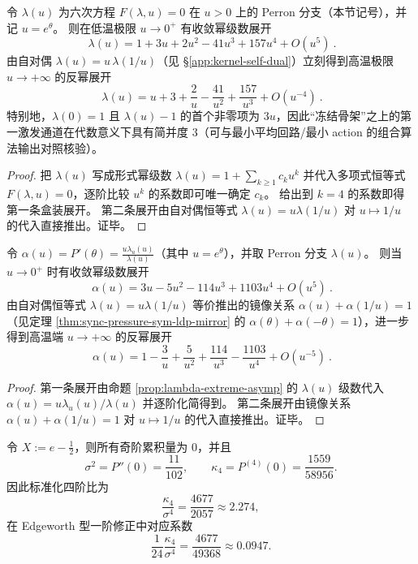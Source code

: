 \begin{proposition}\label{prop:lambda-extreme-asymp}
令 \(\lambda(u)\) 为六次方程 \(F(\lambda,u)=0\) 在 \(u>0\) 上的 Perron 分支（本节记号），并记 \(u=e^\theta\)。
则在低温极限 \(u\to 0^+\) 有收敛幂级数展开
\[
\boxed{\ \lambda(u)=1+3u+2u^2-41u^3+157u^4+O(u^5)\ }.
\]
由自对偶 \(\lambda(u)=u\,\lambda(1/u)\)（见 \S\ref{app:kernel-self-dual}）立刻得到高温极限 \(u\to+\infty\) 的反幂展开
\[
\boxed{\ \lambda(u)=u+3+\frac{2}{u}-\frac{41}{u^2}+\frac{157}{u^3}+O(u^{-4})\ }.
\]
特别地，\(\lambda(0)=1\) 且 \(\lambda(u)-1\) 的首个非零项为 \(3u\)，因此“冻结骨架”之上的第一激发通道在代数意义下具有简并度 \(3\)（可与最小平均回路/最小 action 的组合算法输出对照核验）。
\end{proposition}
\begin{proof}
把 \(\lambda(u)\) 写成形式幂级数
\(
\lambda(u)=1+\sum_{k\ge 1}c_k u^k
\)
并代入多项式恒等式 \(F(\lambda,u)=0\)，逐阶比较 \(u^k\) 的系数即可唯一确定 \(c_k\)。
给出到 \(k=4\) 的系数即得第一条盒装展开。
第二条展开由自对偶恒等式 \(\lambda(u)=u\lambda(1/u)\) 对 \(u\mapsto 1/u\) 的代入直接推出。证毕。
\end{proof}

\begin{corollary}[端点密度 \texorpdfstring{$\alpha(u)=P'(\log u)$}{alpha(u)=P'(log u)} 的局部展开]\label{cor:alpha-endpoint-series}
令 \(\alpha(u)=P'(\theta)=\frac{u\lambda_u(u)}{\lambda(u)}\)（其中 \(u=e^\theta\)），并取 Perron 分支 \(\lambda(u)\)。
则当 \(u\to 0^+\) 时有收敛幂级数展开
\[
\boxed{\ \alpha(u)=3u-5u^2-114u^3+1103u^4+O(u^5)\ }.
\]
由自对偶恒等式 \(\lambda(u)=u\lambda(1/u)\) 等价推出的镜像关系
\(
\alpha(u)+\alpha(1/u)=1
\)
（见定理 \ref{thm:sync-pressure-sym-ldp-mirror} 的 \(\alpha(\theta)+\alpha(-\theta)=1\)），进一步得到高温端 \(u\to+\infty\) 的反幂展开
\[
\boxed{\ \alpha(u)=1-\frac{3}{u}+\frac{5}{u^2}+\frac{114}{u^3}-\frac{1103}{u^4}+O(u^{-5})\ }.
\]
\end{corollary}
\begin{proof}
第一条展开由命题 \ref{prop:lambda-extreme-asymp} 的 \(\lambda(u)\) 级数代入
\(
\alpha(u)=u\lambda_u(u)/\lambda(u)
\)
并逐阶化简得到。
第二条展开由镜像关系 \(\alpha(u)+\alpha(1/u)=1\) 对 \(u\mapsto 1/u\) 的代入直接推出。证毕。
\end{proof}

\begin{corollary}[中心化后的四阶修正系数]\label{cor:edgeworth-fourth}
令 $X:=e-\frac12$，则所有奇阶累积量为 $0$，并且
\[
\sigma^2=P''(0)=\frac{11}{102},\qquad
\kappa_4=P^{(4)}(0)=\frac{1559}{58956}.
\]
因此标准化四阶比为
\[
\frac{\kappa_4}{\sigma^4}=\frac{4677}{2057}\approx 2.274,
\]
在 Edgeworth 型一阶修正中对应系数
\[
\frac{1}{24}\frac{\kappa_4}{\sigma^4}=\frac{4677}{49368}\approx 0.0947.
\]
\end{corollary}

